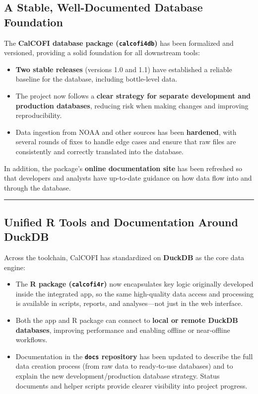 \documentclass[
  letterpaper,
  DIV=11,
  numbers=noendperiod]{scrreprt}
\providecommand{\tightlist}{%
  \setlength{\itemsep}{0pt}\setlength{\parskip}{0pt}}
\begin{document}
\subsection{A Stable, Well-Documented Database
Foundation}\label{a-stable-well-documented-database-foundation}

The \textbf{CalCOFI database package (\texttt{calcofi4db})} has been
formalized and versioned, providing a solid foundation for all
downstream tools:

\begin{itemize}
\tightlist
\item
  \textbf{Two stable releases} (versions 1.0 and 1.1) have established a
  reliable baseline for the database, including bottle-level data.
\item
  The project now follows a \textbf{clear strategy for separate
  development and production databases}, reducing risk when making
  changes and improving reproducibility.
\item
  Data ingestion from NOAA and other sources has been \textbf{hardened},
  with several rounds of fixes to handle edge cases and ensure that raw
  files are consistently and correctly translated into the database.
\end{itemize}

In addition, the package's \textbf{online documentation site} has been
refreshed so that developers and analysts have up-to-date guidance on
how data flow into and through the database.

\begin{center}\rule{0.5\linewidth}{0.5pt}\end{center}

\subsection{Unified R Tools and Documentation Around
DuckDB}\label{unified-r-tools-and-documentation-around-duckdb}

Across the toolchain, CalCOFI has standardized on \textbf{DuckDB} as the
core data engine:

\begin{itemize}
\tightlist
\item
  The \textbf{R package (\texttt{calcofi4r})} now encapsulates key logic
  originally developed inside the integrated app, so the same
  high-quality data access and processing is available in scripts,
  reports, and analyses---not just in the web interface.
\item
  Both the app and R package can connect to \textbf{local or remote
  DuckDB databases}, improving performance and enabling offline or
  near‑offline workflows.
\item
  Documentation in the \textbf{\texttt{docs} repository} has been
  updated to describe the full data creation process (from raw data to
  ready‑to‑use databases) and to explain the new development/production
  database strategy. Status documents and helper scripts provide clearer
  visibility into project progress.
\end{itemize}
\end{document}
